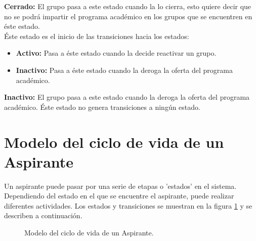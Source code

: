 \noindent \textbf{Cerrado:} El grupo pasa a este estado cuando la  lo cierra, esto quiere decir que no se podrá impartir el programa académico en los grupos que se encuentren en éste estado.\\


Éste estado es el inicio de las transiciones hacia los estados:
\begin{itemize}
	\item \textbf{Activo:} Pasa a éste estado cuando la  decide reactivar un grupo.	
	\item \textbf{Inactivo:} Pasa a éste estado cuando la  deroga la oferta del programa académico.	
\end{itemize}

\noindent \textbf{Inactivo:} El grupo pasa a este estado cuando la  deroga la oferta del programa académico. Éste estado no genera transiciones a ningún estado.



\hypertarget{cv:Aspirante}{\section{Modelo del ciclo de vida de un Aspirante} }

Un aspirante puede pasar por una serie de etapas o 'estados' en el sistema. Dependiendo del estado en el que se encuentre el aspirante, puede realizar diferentes actividades. Los estados y transiciones se muestran en la figura \ref{fig:MEaspirante} y se describen a continuación.\\

\begin{figure}[htbp!]
	\centering
	\caption{Modelo del ciclo de vida de un Aspirante.}
	\label{fig:MEaspirante}
\end{figure}

